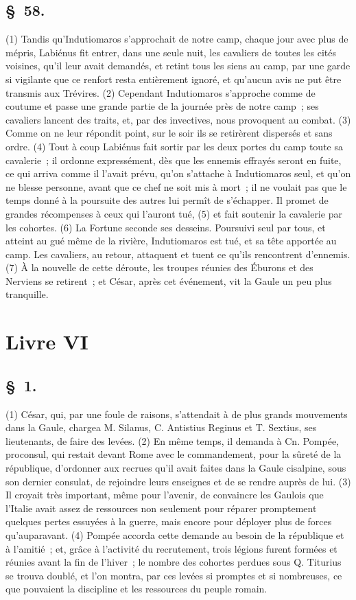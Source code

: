 \documentclass[french,twoside]{book} %
\begin{document}
\subsection[{§ 58.}]{ \textsc{§ 58.} }
\noindent (1) Tandis qu’Indutiomaros s’approchait de notre camp, chaque jour avec plus de mépris, Labiénus fit entrer, dans une seule nuit, les cavaliers de toutes les cités voisines, qu’il leur avait demandés, et retint tous les siens au camp, par une garde si vigilante que ce renfort resta entièrement ignoré, et qu’aucun avis ne put être transmis aux Trévires. (2) Cependant Indutiomaros s’approche comme de coutume et passe une grande partie de la journée près de notre camp ; ses cavaliers lancent des traits, et, par des invectives, nous provoquent au combat. (3) Comme on ne leur répondit point, sur le soir ils se retirèrent dispersés et sans ordre. (4) Tout à coup Labiénus fait sortir par les deux portes du camp toute sa cavalerie ; il ordonne expressément, dès que les ennemis effrayés seront en fuite, ce qui arriva comme il l’avait prévu, qu’on s’attache à Indutiomaros seul, et qu’on ne blesse personne, avant que ce chef ne soit mis à mort ; il ne voulait pas que le temps donné à la poursuite des autres lui permît de s’échapper. Il promet de grandes récompenses à ceux qui l’auront tué, (5) et fait soutenir la cavalerie par les cohortes. (6) La Fortune seconde ses desseins. Poursuivi seul par tous, et atteint au gué même de la rivière, Indutiomaros est tué, et sa tête apportée au camp. Les cavaliers, au retour, attaquent et tuent ce qu’ils rencontrent d’ennemis. (7) À la nouvelle de cette déroute, les troupes réunies des Éburons et des Nerviens se retirent ; et César, après cet événement, vit la Gaule un peu plus tranquille.
\section[{Livre VI}]{Livre VI}\renewcommand{\leftmark}{Livre VI}

\subsection[{§ 1.}]{ \textsc{§ 1.} }
\noindent (1) César, qui, par une foule de raisons, s’attendait à de plus grands mouvements dans la Gaule, chargea M. Silanus, C. Antistius Reginus et T. Sextius, ses lieutenants, de faire des levées. (2) En même temps, il demanda à Cn. Pompée, proconsul, qui restait devant Rome avec le commandement, pour la sûreté de la république, d’ordonner aux recrues qu’il avait faites dans la Gaule cisalpine, sous son dernier consulat, de rejoindre leurs enseignes et de se rendre auprès de lui. (3) Il croyait très important, même pour l’avenir, de convaincre les Gaulois que l’Italie avait assez de ressources non seulement pour réparer promptement quelques pertes essuyées à la guerre, mais encore pour déployer plus de forces qu’auparavant. (4) Pompée accorda cette demande au besoin de la république et à l’amitié ; et, grâce à l’activité du recrutement, trois légions furent formées et réunies avant la fin de l’hiver ; le nombre des cohortes perdues sous Q. Titurius se trouva doublé, et l’on montra, par ces levées si promptes et si nombreuses, ce que pouvaient la discipline et les ressources du peuple romain.
\end{document}
